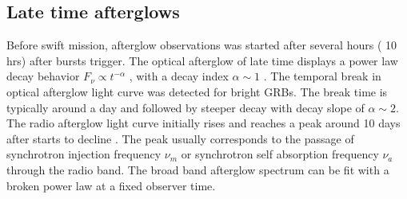 \subsection{ Late time afterglows }
Before swift mission, afterglow observations was started after several hours ( 10 hrs) after bursts trigger. The optical afterglow of late time displays a power law decay behavior $ F_{\nu}   \propto   t^{-\alpha} $  , with a decay index  $\alpha  \sim  1 $ . The temporal break in  optical afterglow light curve was detected for bright GRBs. The break time is typically around a day and followed by steeper decay with decay slope of $ \alpha  \sim 2 $.
The radio afterglow light curve initially rises and reaches a peak around 10 days
after  starts to decline . The peak usually corresponds to the passage of synchrotron injection frequency $ \nu_{m} $ or synchrotron self absorption frequency $ \nu_{a} $through the radio band. The broad band afterglow spectrum can be fit with a broken power law at a fixed observer time. \citep{24}\citep{25}
